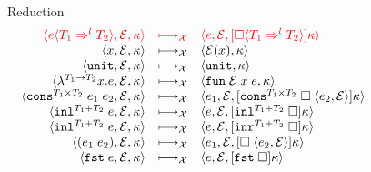\documentclass[acmsmall,review,anonymous]{acmart}\settopmatter{printfolios=true,printccs=false,printacmref=false}
\newcommand{\plus}[0]{+}
\newcommand{\lazyUD}{Lazy\;UD}
\newcommand{\lazyD}{Lazy\;D}
\newcommand{\sOOinspect}[3]{\langle#1,#2,#3\rangle}
\newcommand{\sOOreturn}[2]{\langle#1,#2\rangle}
\newcommand{\POOprod}[2]{#1 \times #2}
\newcommand{\POOsum}[2]{#1 \plus #2}
\newcommand{\eOOvar}[1]{#1}
\newcommand{\eOOsole}[0]{\mathtt{unit}}
\newcommand{\eOOlam}[4]{\lambda^{#1\rightarrow{}#2}#3.#4}
\newcommand{\eOOapp}[2]{(#1 \; #2)}
\newcommand{\eOOcons}[4]{\mathtt{cons}^{\POOprod{#1}{#2}} \; #3 \; #4}
\newcommand{\eOOcar}[1]{\mathtt{fst} \; #1}
\newcommand{\eOOinl}[3]{\mathtt{inl}^{\POOsum{#1}{#2}} \; #3}
\newcommand{\eOOcast}[4]{#1 \langle \cOOcast{#2}{#3}{#4} \rangle}
\newcommand{\cOOcast}[3]{#1 \Rightarrow^{#2} #3}
\newcommand{\vOOfun}[3]{\mathtt{fun} \; #1 \; #2 \; #3}
\newcommand{\vOOtt}[0]{\mathtt{unit}}
\newcommand{\kOOconsI}[5]{
	[\mathtt{cons}^{\POOprod{#1}{#2}} \; \square \; \langle#3,#4\rangle ]#5}
\newcommand{\kOOinl}[3]{[\mathtt{inl}^{\POOsum{#1}{#2}}\; \square]#3}
\newcommand{\kOOinr}[3]{[\mathtt{inr}^{\POOsum{#1}{#2}}\; \square]#3}
\newcommand{\kOOappI}[3]{
  [\square \; \langle#1,#2\rangle]#3
}
\newcommand{\kOOcar}[1]{[\mathtt{fst} \; \square]#1}
\newcommand{\kOOcast}[2]{
  [\square \langle #1 \rangle]#2}
\newcommand{\judgeCreduce}[2]{#1 \longmapsto_{\mathcal{X}} #2}
\newcommand{\redrule}[3]{#1 & \longmapsto_\mathcal{X} & #2 & #3\\}
\newcommand{\hiredrule}[3]{\highlight{#1} & \highlight{\longmapsto_\mathcal{X}} 
& \highlight{#2} & \highlight{#3} \\}
\newcommand{\highlight}[1]{{\color{red} #1}}
\begin{document}

\begin{figure}
  
  \[
  \begin{array}{rclr}
  \end{array}
  \]
  
  Reduction \fbox{$\judgeCreduce{s}{s}$}
  \[
  \begin{array}{rclr}
    \hiredrule{
    \sOOinspect{\eOOcast{e}{T_1}{l}{T_2}}{\mathcal{E}}{\kappa}
  }{
    \sOOinspect{e}{\mathcal{E}}{
      \kOOcast{\cOOcast{T_1}{l}{T_2}}{\kappa}
    }
  }{}
  \redrule{
    \sOOinspect{\eOOvar{x}}{\mathcal{E}}{\kappa}
  }{  
    \sOOreturn{\mathcal{E}(x)}{\kappa}
  }{}
  \redrule{
    \sOOinspect{\eOOsole}{\mathcal{E}}{\kappa}
  }{
    \sOOreturn{\vOOtt}{\kappa}
  }{}
  \redrule{
    \sOOinspect{\eOOlam{T_1}{T_2}{x}{e}}{\mathcal{E}}{\kappa}
  }{
    \sOOreturn{\vOOfun{\mathcal{E}}{x}{e}}{\kappa}
  }{}
  \redrule{
    \sOOinspect{\eOOcons{T_1}{T_2}{e_1}{e_2}}{\mathcal{E}}{\kappa}
  }{
    \sOOinspect{e_1}{\mathcal{E}}{\kOOconsI{T_1}{T_2}{e_2}{\mathcal{E}}{\kappa}}
  }{}
  \redrule{
    \sOOinspect{\eOOinl{T_1}{T_2}{e}}{\mathcal{E}}{\kappa}
  }{
    \sOOinspect{e}{\mathcal{E}}{\kOOinl{T_1}{T_2}{\kappa}}
  }{}
  \redrule{
  \sOOinspect{\eOOinl{T_1}{T_2}{e}}{\mathcal{E}}{\kappa}
  }{
  \sOOinspect{e}{\mathcal{E}}{\kOOinr{T_1}{T_2}{\kappa}}
  }{}
  \redrule{
    \sOOinspect{\eOOapp{e_1}{e_2}}{\mathcal{E}}{\kappa}
  }{
\sOOinspect{e_1}{\mathcal{E}}{\kOOappI{e_2}{\mathcal{E}}{\kappa}}}{}

\redrule{
\sOOinspect{\eOOcar{e}}{\mathcal{E}}{\kappa}}{
\sOOinspect{e}{\mathcal{E}}{\kOOcar{\kappa}}}{}


\end{array}\]
\end{figure}
\end{document}
